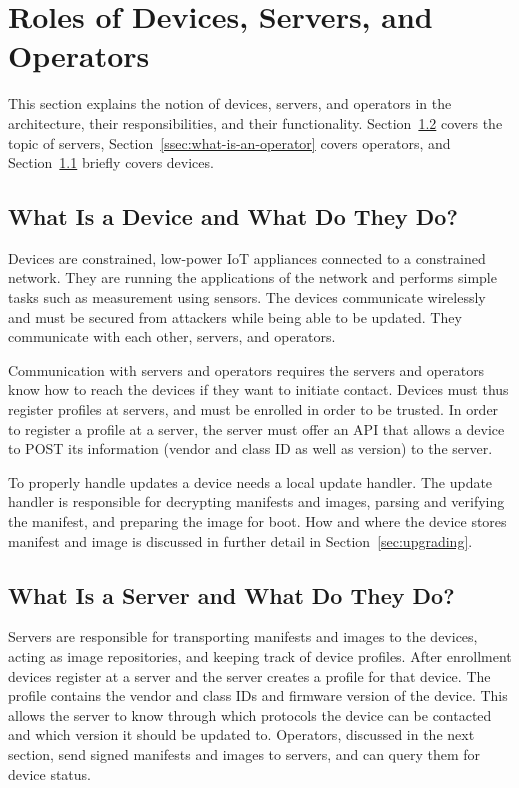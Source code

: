 \documentclass[0-thesis.tex]{subfiles}
\begin{document}
\section{Roles of Devices, Servers, and Operators}
\label{sec:roles}
This section explains the notion of devices, servers, and operators in the architecture,
their responsibilities, and their functionality. Section~\ref{ssec:what-is-a-server}
covers the topic of servers, Section~\ref{ssec:what-is-an-operator} covers operators, and
Section~\ref{ssec:what-is-a-device} briefly covers devices.

\subsection{What Is a Device and What Do They Do?}
\label{ssec:what-is-a-device}
Devices are constrained, low-power IoT appliances connected to a constrained network. They
are running the applications of the network and performs simple tasks such as measurement
using sensors. The devices communicate wirelessly and must be secured from attackers while
being able to be updated. They communicate with each other, servers, and operators.

Communication with servers and operators requires the servers and operators know how to
reach the devices if they want to initiate contact. Devices must thus register profiles at
servers, and must be enrolled in order to be trusted. In order to register a profile at a
server, the server must offer an API that allows a device to POST its information
(vendor and class ID as well as version) to the server. 

To properly handle updates a device needs a local update handler. The update handler is
responsible for decrypting manifests and images, parsing and verifying the manifest, and
preparing the image for boot. How and where the device stores manifest and image is
discussed in further detail in Section~\ref{sec:upgrading}.

\subsection{What Is a Server and What Do They Do?}
\label{ssec:what-is-a-server}
Servers are responsible for transporting manifests and images to the devices, acting as
image repositories, and keeping track of device profiles. After enrollment devices
register at a server and the server creates a profile for that device. The profile
contains the vendor and class IDs and firmware version of the device. This allows the
server to know through which protocols the device can be contacted and which version it
should be updated to. Operators, discussed in the next section, send signed manifests and
images to servers, and can query them for device status.
\end{document}

